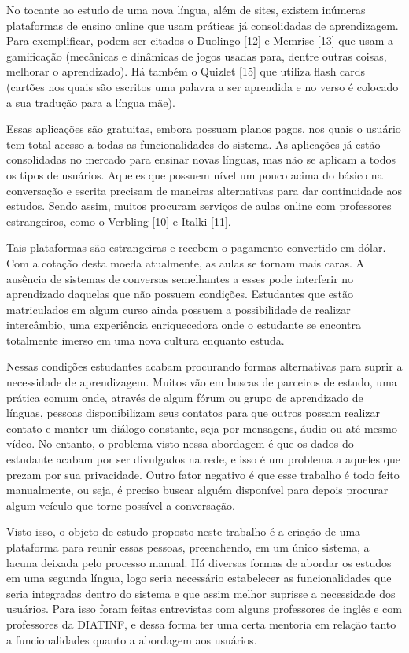 No tocante ao estudo de uma nova língua, além de sites, existem inúmeras plataformas de ensino online que usam práticas já consolidadas de aprendizagem. Para exemplificar, podem ser citados o Duolingo [12] e Memrise [13] que usam a gamificação (mecânicas e dinâmicas de jogos usadas para, dentre outras coisas, melhorar o aprendizado). Há também o Quizlet [15] que utiliza flash cards (cartões nos quais são escritos uma palavra a ser aprendida e no verso é colocado a sua tradução para a língua mãe).

Essas aplicações são gratuitas, embora possuam planos pagos, nos quais o usuário tem total acesso a todas as funcionalidades do sistema. As aplicações já estão consolidadas no mercado para ensinar novas línguas, mas não se aplicam a todos os tipos de usuários. Aqueles que possuem nível um pouco acima do básico na conversação e escrita precisam de maneiras alternativas para dar continuidade aos estudos. Sendo assim, muitos procuram serviços de aulas online com professores estrangeiros, como o Verbling [10] e Italki [11].

Tais plataformas são estrangeiras e recebem o pagamento convertido em dólar. Com a cotação desta moeda atualmente, as aulas se tornam mais caras. A ausência de sistemas de conversas semelhantes a esses pode interferir no aprendizado daquelas que não possuem condições. Estudantes que estão matriculados em algum curso ainda possuem a possibilidade de realizar intercâmbio, uma experiência enriquecedora onde o estudante se encontra totalmente imerso em uma nova cultura enquanto estuda.

Nessas condições estudantes acabam procurando formas alternativas para suprir a necessidade de aprendizagem. Muitos vão em buscas de parceiros de estudo, uma prática comum onde, através de algum fórum ou grupo de aprendizado de línguas, pessoas disponibilizam seus contatos para que outros possam realizar contato e manter um diálogo constante, seja por mensagens, áudio ou até mesmo vídeo. No entanto, o problema visto nessa abordagem é que os dados do estudante acabam por ser divulgados na rede, e isso é um problema a aqueles que prezam por sua privacidade. Outro fator negativo é que esse trabalho é todo feito manualmente, ou seja, é preciso buscar alguém disponível para depois procurar algum veículo que torne possível a conversação.

Visto isso, o objeto de estudo proposto neste trabalho é a criação de uma plataforma para reunir essas pessoas, preenchendo, em um único sistema, a lacuna deixada pelo processo manual. Há diversas formas de abordar os estudos em uma segunda língua, logo seria necessário estabelecer as funcionalidades que seria integradas dentro do sistema e que assim melhor suprisse a necessidade dos usuários. Para isso foram feitas entrevistas com alguns professores de inglês e com professores da DIATINF, e dessa forma ter uma certa mentoria em relação tanto a funcionalidades quanto a abordagem aos usuários. 


